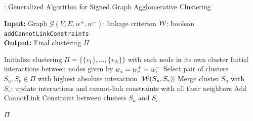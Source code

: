 \begin{algorithm}[t]
  \caption{\algname{}: Generalized Algorithm for Signed Graph Agglomerative Clustering}
   \hspace*{\algorithmicindent} \textbf{Input:} Graph $\mathcal{G}(V,E,w^+,w^-)$; linkage criterion $\mathcal{W}{}$; boolean {\color{blue}\texttt{addCannotLinkConstraints}}  \\
  \hspace*{\algorithmicindent} \textbf{Output:} Final clustering $\Pi$\\
  \hspace*{\algorithmicindent} 
  \begin{algorithmic}[1]
      \State Initialize clustering $\Pi=\{\{v_1\}, \ldots, \{v_N\}\}$ with each node in its own cluster
      \State Initial interactions between nodes given by $w_e = w^+_e - w^-_e$
      \Repeat
        \State Select pair of clusters $S_u,S_v\in\Pi$ with highest absolute interaction $|\mathcal{W}{}(S_u,S_v)|$
          \State Merge cluster $S_u$ with $S_v$: update interactions and cannot-link constraints with all their neighbors
          \State Add CannotLink Constraint between clusters $S_u$ and $S_v$
        \EndIf
      
      \State
      \Return $\Pi$
  \end{algorithmic}
  \label{main_alg}
\end{algorithm}

